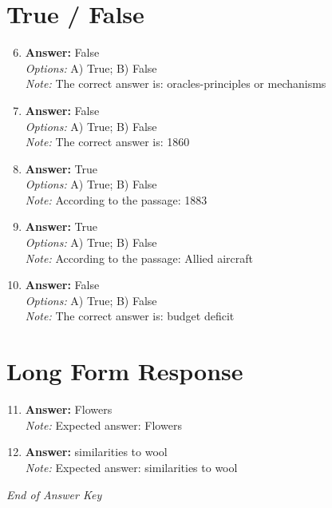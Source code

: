 \documentclass[12pt]{article}
\begin{document}
\section*{True / False}
\begin{enumerate}[label=\arabic*.]
\setcounter{enumi}{5}
\item \textbf{Answer:} False
\\ \textit{Options:} A) True; B) False
\\ \textit{Note:} The correct answer is: oracles-principles or mechanisms
\item \textbf{Answer:} False
\\ \textit{Options:} A) True; B) False
\\ \textit{Note:} The correct answer is: 1860
\item \textbf{Answer:} True
\\ \textit{Options:} A) True; B) False
\\ \textit{Note:} According to the passage: 1883
\item \textbf{Answer:} True
\\ \textit{Options:} A) True; B) False
\\ \textit{Note:} According to the passage: Allied aircraft
\item \textbf{Answer:} False
\\ \textit{Options:} A) True; B) False
\\ \textit{Note:} The correct answer is: budget deficit
\end{enumerate}

\section*{Long Form Response}
\begin{enumerate}[label=\arabic*.]
\setcounter{enumi}{10}
\item \textbf{Answer:} Flowers
\\ \textit{Note:} Expected answer: Flowers
\item \textbf{Answer:} similarities to wool
\\ \textit{Note:} Expected answer: similarities to wool
\end{enumerate}

\vfill
\noindent\textit{End of Answer Key}
\end{document}
